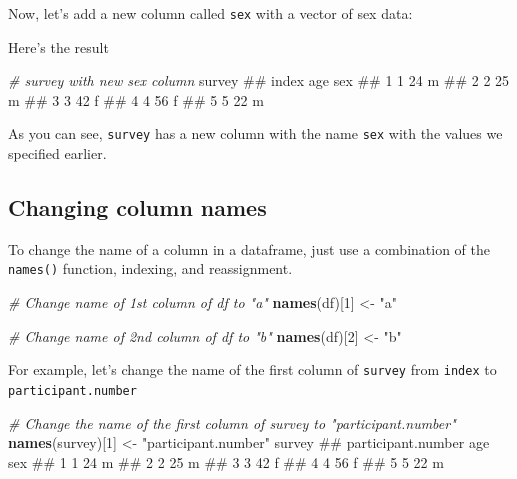 \documentclass[]{book}
\newenvironment{Shaded}{\begin{snugshade}}{\end{snugshade}}
\newcommand{\KeywordTok}[1]{\textcolor[rgb]{0.13,0.29,0.53}{\textbf{{#1}}}}
\newcommand{\DecValTok}[1]{\textcolor[rgb]{0.00,0.00,0.81}{{#1}}}
\newcommand{\StringTok}[1]{\textcolor[rgb]{0.31,0.60,0.02}{{#1}}}
\newcommand{\CommentTok}[1]{\textcolor[rgb]{0.56,0.35,0.01}{\textit{{#1}}}}
\newcommand{\NormalTok}[1]{{#1}}
\theoremstyle{definition}
\theoremstyle{definition}
\theoremstyle{remark}
\begin{document}
Now, let's add a new column called \texttt{sex} with a vector of sex
data:

\begin{Shaded}
\end{Shaded}

Here's the result

\begin{Shaded}
\begin{Highlighting}[]
\CommentTok{# survey with new sex column}
\NormalTok{survey}
\NormalTok{##   index age sex}
\NormalTok{## 1     1  24   m}
\NormalTok{## 2     2  25   m}
\NormalTok{## 3     3  42   f}
\NormalTok{## 4     4  56   f}
\NormalTok{## 5     5  22   m}
\end{Highlighting}
\end{Shaded}

As you can see, \texttt{survey} has a new column with the name
\texttt{sex} with the values we specified earlier.

\subsection{Changing column names}\label{changing-column-names}

To change the name of a column in a dataframe, just use a combination of
the \texttt{names()} function, indexing, and reassignment.

\begin{Shaded}
\begin{Highlighting}[]
\CommentTok{# Change name of 1st column of df to "a"}
\KeywordTok{names}\NormalTok{(df)[}\DecValTok{1}\NormalTok{] <-}\StringTok{ "a"}

\CommentTok{# Change name of 2nd column of df to "b"}
\KeywordTok{names}\NormalTok{(df)[}\DecValTok{2}\NormalTok{] <-}\StringTok{ "b"}
\end{Highlighting}
\end{Shaded}

For example, let's change the name of the first column of
\texttt{survey} from \texttt{index} to \texttt{participant.number}

\begin{Shaded}
\begin{Highlighting}[]
\CommentTok{# Change the name of the first column of survey to "participant.number"}
\KeywordTok{names}\NormalTok{(survey)[}\DecValTok{1}\NormalTok{] <-}\StringTok{ "participant.number"}
\NormalTok{survey}
\NormalTok{##   participant.number age sex}
\NormalTok{## 1                  1  24   m}
\NormalTok{## 2                  2  25   m}
\NormalTok{## 3                  3  42   f}
\NormalTok{## 4                  4  56   f}
\NormalTok{## 5                  5  22   m}
\end{Highlighting}
\end{Shaded}
\end{document}
